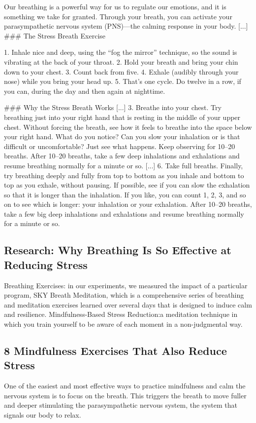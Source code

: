 \documentclass[12pt]{article}
\begin{document}
Our breathing is a powerful way for us to regulate our emotions, and it is something we take for granted. Through your breath, you can activate your parasympathetic nervous system (PNS)—the calming response in your body. [...] \#\#\# The Stress Breath Exercise

1.   Inhale nice and deep, using the “fog the mirror” technique, so the sound is vibrating at the back of your throat.
2.   Hold your breath and bring your chin down to your chest.
3.   Count back from five.
4.   Exhale (audibly through your nose) while you bring your head up.
5.   That’s one cycle. Do twelve in a row, if you can, during the day and then again at nighttime.

\#\#\# Why the Stress Breath Works [...] 3. Breathe into your chest. Try breathing just into your right hand that is resting in the middle of your upper chest. Without forcing the breath, see how it feels to breathe into the space below your right hand. What do you notice? Can you slow your inhalation or is that difficult or uncomfortable? Just see what happens. Keep observing for 10–20 breaths. After 10–20 breaths, take a few deep inhalations and exhalations and resume breathing normally for a minute or so. [...] 6. Take full breaths. Finally, try breathing deeply and fully from top to bottom as you inhale and bottom to top as you exhale, without pausing. If possible, see if you can slow the exhalation so that it is longer than the inhalation. If you like, you can count 1, 2, 3, and so on to see which is longer: your inhalation or your exhalation. After 10–20 breaths, take a few big deep inhalations and exhalations and resume breathing normally for a minute or so.\subsection{Research: Why Breathing Is So Effective at Reducing Stress}
Breathing Exercises: in our experiments, we measured the impact of a particular program, SKY Breath Meditation, which is a comprehensive series of breathing and meditation exercises learned over several days that is designed to induce calm and resilience.
   Mindfulness-Based Stress Reduction:a meditation technique in which you train yourself to be aware of each moment in a non-judgmental way.\subsection{8 Mindfulness Exercises That Also Reduce Stress}
One of the easiest and most effective ways to practice mindfulness and calm the nervous system is to focus on the breath. This triggers the breath to move fuller and deeper stimulating the parasympathetic nervous system, the system that signals our body to relax.
\end{document}
